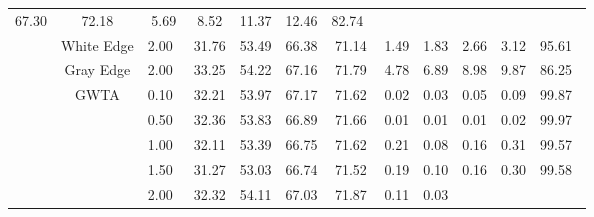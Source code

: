 \begin{table}[htbp]
{\begin{tabular}{cc|c|ccccccccc}
  \multicolumn{1}{c|}{67.30} &
  \multicolumn{1}{c|}{72.18} &
  \multicolumn{1}{c|}{5.69} &
  \multicolumn{1}{c|}{8.52} &
  \multicolumn{1}{c|}{11.37} &
  \multicolumn{1}{c|}{12.46} &
  82.74\ \\ \cline{2-12} 
\multicolumn{1}{c|}{} &
  White Edge &
  2.00\ &
  \multicolumn{1}{c|}{31.76} &
  \multicolumn{1}{c|}{53.49} &
  \multicolumn{1}{c|}{66.38} &
  \multicolumn{1}{c|}{71.14} &
  \multicolumn{1}{c|}{1.49} &
  \multicolumn{1}{c|}{1.83} &
  \multicolumn{1}{c|}{2.66} &
  \multicolumn{1}{c|}{3.12} &
  95.61\ \\ \cline{2-12} 
\multicolumn{1}{c|}{} &
  Gray Edge &
  2.00\ &
  \multicolumn{1}{c|}{33.25} &
  \multicolumn{1}{c|}{54.22} &
  \multicolumn{1}{c|}{67.16} &
  \multicolumn{1}{c|}{71.79} &
  \multicolumn{1}{c|}{4.78} &
  \multicolumn{1}{c|}{6.89} &
  \multicolumn{1}{c|}{8.98} &
  \multicolumn{1}{c|}{9.87} &
  86.25\ \\ \cline{2-12} 
\multicolumn{1}{c|}{} &
  \multirow{9}{*}{GWTA}&
  0.10\ &
  \multicolumn{1}{c|}{32.21} &
  \multicolumn{1}{c|}{53.97} &
  \multicolumn{1}{c|}{67.17} &
  \multicolumn{1}{c|}{71.62} &
  \multicolumn{1}{c|}{0.02} &
  \multicolumn{1}{c|}{0.03} &
  \multicolumn{1}{c|}{0.05} &
  \multicolumn{1}{c|}{0.09} &
  99.87\ \\ \cline{3-12} 
\multicolumn{1}{c|}{} &
   &
  0.50\ &
  \multicolumn{1}{c|}{32.36} &
  \multicolumn{1}{c|}{53.83} &
  \multicolumn{1}{c|}{66.89} &
  \multicolumn{1}{c|}{71.66} &
  \multicolumn{1}{c|}{0.01} &
  \multicolumn{1}{c|}{0.01} &
  \multicolumn{1}{c|}{0.01} &
  \multicolumn{1}{c|}{0.02} &
  99.97\ \\ \cline{3-12} 
\multicolumn{1}{c|}{} &
   &
  1.00\ &
  \multicolumn{1}{c|}{32.11} &
  \multicolumn{1}{c|}{53.39} &
  \multicolumn{1}{c|}{66.75} &
  \multicolumn{1}{c|}{71.62} &
  \multicolumn{1}{c|}{0.21} &
  \multicolumn{1}{c|}{0.08} &
  \multicolumn{1}{c|}{0.16} &
  \multicolumn{1}{c|}{0.31} &
  99.57\ \\ \cline{3-12} 
\multicolumn{1}{c|}{} &
   &
  1.50\ &
  \multicolumn{1}{c|}{31.27} &
  \multicolumn{1}{c|}{53.03} &
  \multicolumn{1}{c|}{66.74} &
  \multicolumn{1}{c|}{71.52} &
  \multicolumn{1}{c|}{0.19} &
  \multicolumn{1}{c|}{0.10} &
  \multicolumn{1}{c|}{0.16} &
  \multicolumn{1}{c|}{0.30} &
  99.58\ \\ \cline{3-12} 
\multicolumn{1}{c|}{} &
   &
  2.00\ &
  \multicolumn{1}{c|}{32.32} &
  \multicolumn{1}{c|}{54.11} &
  \multicolumn{1}{c|}{67.03} &
  \multicolumn{1}{c|}{71.87} &
  \multicolumn{1}{c|}{0.11} &
  \multicolumn{1}{c|}{0.03} &

\end{tabular}}
\end{table}
